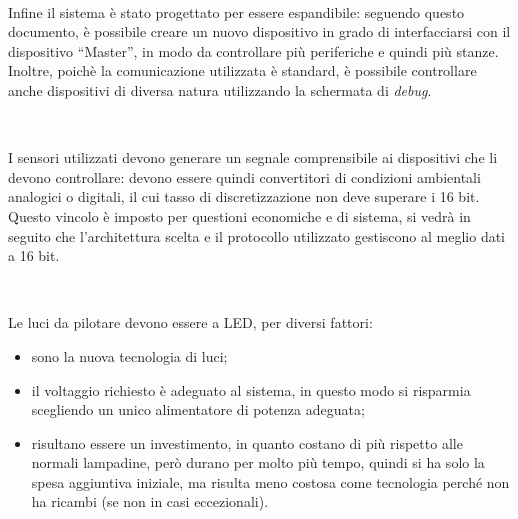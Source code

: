 \documentclass[a4paper,titlepage]{book}
\newcommand{\itema}{\begin{itemize}[noitemsep,topsep=10pt,parsep=5pt,partopsep=10pt]}
\begin{document}
~

Infine il sistema è stato progettato per essere espandibile: seguendo questo documento, è possibile creare un nuovo dispositivo in grado di interfacciarsi con il dispositivo ``Master'', in modo da controllare più periferiche e quindi più stanze. Inoltre, poichè la comunicazione utilizzata è standard, è possibile controllare anche dispositivi di diversa natura utilizzando la schermata di \textit{debug}.

~

I sensori utilizzati devono generare un segnale comprensibile ai dispositivi che li devono controllare: devono essere quindi convertitori di condizioni ambientali analogici o digitali, il cui tasso di discretizzazione non deve superare i 16 bit. Questo vincolo è imposto per questioni economiche e di sistema, si vedrà in seguito che l'architettura scelta e il protocollo utilizzato gestiscono al meglio dati a 16 bit.

~

Le luci da pilotare devono essere a LED, per diversi fattori:

\itema

\item sono la nuova tecnologia di luci;

\item il voltaggio richiesto è adeguato al sistema, in questo modo si risparmia scegliendo un unico alimentatore di potenza adeguata;

\item risultano essere un investimento, in quanto costano di più rispetto alle normali lampadine, però durano per molto più tempo, quindi si ha solo la spesa aggiuntiva iniziale, ma risulta meno costosa come tecnologia perché non ha ricambi (se non in casi eccezionali).

\end{itemize}

\end{document}
